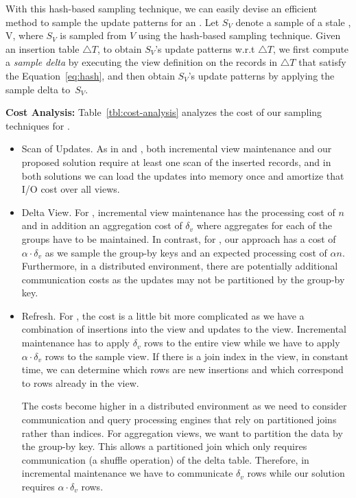 With this hash-based sampling technique, we can easily devise an efficient method to sample the update patterns for an \aggview. Let $S_{V}$ denote a sample of a stale \aggview, V, where $S_{V}$ is sampled from $V$ using the hash-based sampling technique. Given an insertion table $\triangle T$, to obtain $S_{V}$'s update patterns w.r.t $\triangle T$, we first compute a \emph{sample delta \aggview} by executing the view definition on the records in $\triangle T$ that satisfy the Equation~\ref{eq:hash}, and then obtain $S_{V}$'s update patterns by applying the sample delta \aggview to~$S_{V}$. 

\vspace{.5em}
{\noindent \bf Cost Analysis: }
 Table~\ref{tbl:cost-analysis} analyzes the cost of our sampling techniques for \aggview.
\vspace{-0.5em}
\begin{itemize}
\item Scan of Updates.
As in \spview and \fjview, both incremental view maintenance and our proposed solution require at least one scan of the inserted records, and in both solutions we can load the updates into memory once and amortize that I/O cost over all views. \vspace{-0.5em}
\item Delta View. For \aggview, incremental view maintenance has the processing cost of $n$ and in addition an aggregation cost of $\delta_v$ where aggregates for each of the groups have to be maintained. In contrast, for \aggview, our approach has a cost of $\alpha \cdot \delta_v$ as we sample the group-by keys and an expected processing cost of $\alpha n$.  
Furthermore, in a distributed environment, there are potentially additional communication costs as the updates may not be partitioned by the group-by key. \vspace{-0.5em}
\item Refresh. For \aggview, the cost is a little bit more complicated as we have a combination of insertions into the view and updates to the view. 
Incremental maintenance has to apply $\delta_v$ rows to the entire view while we have to apply $\alpha \cdot \delta_v$ rows to the sample view. 
If there is a join index in the view, in constant time, we can determine which rows are new insertions and which correspond to rows already in the view.

\vspace{-0.25em}

The costs become higher in a distributed environment as we need to consider communication and query processing engines that rely on partitioned joins rather than indices.
For aggregation views, we want to partition the data by the group-by key.
This allows a partitioned join which only requires communication (a shuffle operation) of the delta table.
Therefore, in incremental maintenance we have to communicate $\delta_v$ rows while our solution requires $\alpha \cdot \delta_v$ rows.  
\end{itemize}

